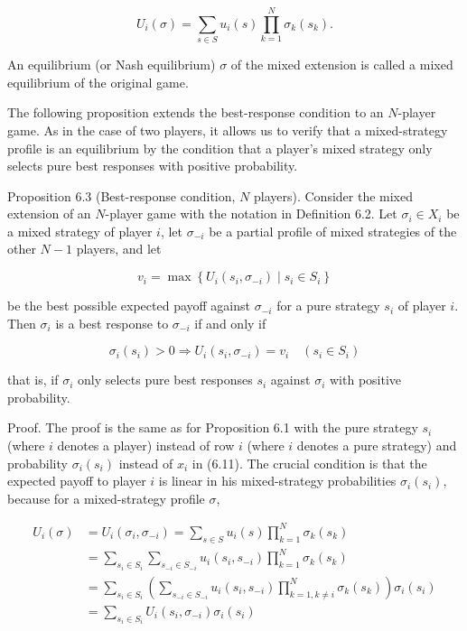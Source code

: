 \documentclass[12pt]{article}
\begin{document}
$$
U_{i}(\sigma)=\sum_{s \in S} u_{i}(s) \prod_{k=1}^{N} \sigma_{k}\left(s_{k}\right) .
$$

An equilibrium (or Nash equilibrium) $\sigma$ of the mixed extension is called a mixed equilibrium of the original game.

The following proposition extends the best-response condition to an $N$-player game. As in the case of two players, it allows us to verify that a mixed-strategy profile is an equilibrium by the condition that a player's mixed strategy only selects pure best responses with positive probability.

Proposition 6.3 (Best-response condition, $N$ players). Consider the mixed extension of an $N$-player game with the notation in Definition 6.2. Let $\sigma_{i} \in X_{i}$ be a mixed strategy of player $i$, let $\sigma_{-i}$ be a partial profile of mixed strategies of the other $N-1$ players, and let

$$
v_{i}=\max \left\{U_{i}\left(s_{i}, \sigma_{-i}\right) \mid s_{i} \in S_{i}\right\}
$$

be the best possible expected payoff against $\sigma_{-i}$ for a pure strategy $s_{i}$ of player $i$. Then $\sigma_{i}$ is a best response to $\sigma_{-i}$ if and only if

$$
\sigma_{i}\left(s_{i}\right)>0 \Rightarrow U_{i}\left(s_{i}, \sigma_{-i}\right)=v_{i} \quad\left(s_{i} \in S_{i}\right)
$$

that is, if $\sigma_{i}$ only selects pure best responses $s_{i}$ against $\sigma_{i}$ with positive probability.

Proof. The proof is the same as for Proposition 6.1 with the pure strategy $s_{i}$ (where $i$ denotes a player) instead of row $i$ (where $i$ denotes a pure strategy) and probability $\sigma_{i}\left(s_{i}\right)$ instead of $x_{i}$ in (6.11). The crucial condition is that the expected payoff to player $i$ is linear in his mixed-strategy probabilities $\sigma_{i}\left(s_{i}\right)$, because for a mixed-strategy profile $\sigma$,


\begin{align*}
U_{i}(\sigma) & =U_{i}\left(\sigma_{i}, \sigma_{-i}\right)=\sum_{s \in S} u_{i}(s) \prod_{k=1}^{N} \sigma_{k}\left(s_{k}\right) \\
& =\sum_{s_{i} \in S_{i}} \sum_{s_{-i} \in S_{-i}} u_{i}\left(s_{i}, s_{-i}\right) \prod_{k=1}^{N} \sigma_{k}\left(s_{k}\right) \\
& =\sum_{s_{i} \in S_{i}}\left(\sum_{s_{-i} \in S_{-i}} u_{i}\left(s_{i}, s_{-i}\right) \prod_{k=1, k \neq i}^{N} \sigma_{k}\left(s_{k}\right)\right) \sigma_{i}\left(s_{i}\right) \\
& =\sum_{s_{i} \in S_{i}} U_{i}\left(s_{i}, \sigma_{-i}\right) \sigma_{i}\left(s_{i}\right) \tag{6.20}
\end{align*}
\end{document}
